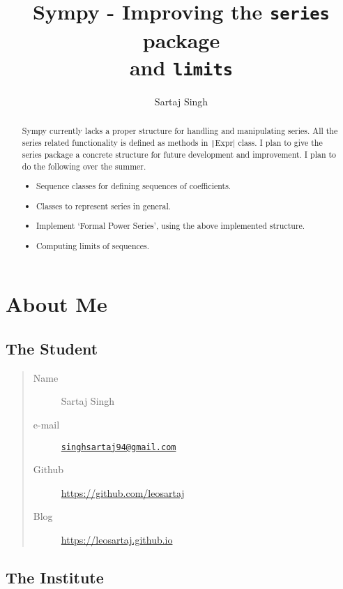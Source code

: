 \documentclass[a4paper,12pt]{article}
\title{Sympy - Improving the \texttt{series} package\hfill\\ and \texttt{limits}}
\author{Sartaj Singh}
\newcommand{\pyline}[1]{\texttt|#1|}
\begin{document}
\maketitle

\begin{abstract}

  Sympy currently lacks a proper structure for handling and
  manipulating series. All the series related functionality is defined
  as methods in \pyline{Expr} class. I plan to give the series package a
  concrete structure for future development and improvement. I plan to
  do the following over the summer.

  \begin{itemize}
    \item Sequence classes for defining sequences of coefficients.
    \item Classes to represent series in general.
    \item Implement `Formal Power Series', using the above implemented structure.
    \item Computing limits of sequences.
  \end{itemize}

\end{abstract}

\tableofcontents

\section{About Me}

\subsection*{The Student}

\begin{quote}
  \begin{description}
    \item [Name] {Sartaj Singh}
    \item [e-mail] {\href{mailto:singhsartaj94@gmail.com}
      {\nolinkurl{singhsartaj94@gmail.com}}}
    \item [Github] {\url{https://github.com/leosartaj}}
    \item [Blog] {\url{https://leosartaj.github.io}}
  \end{description}
\end{quote}

\subsection*{The Institute}
\end{document}
